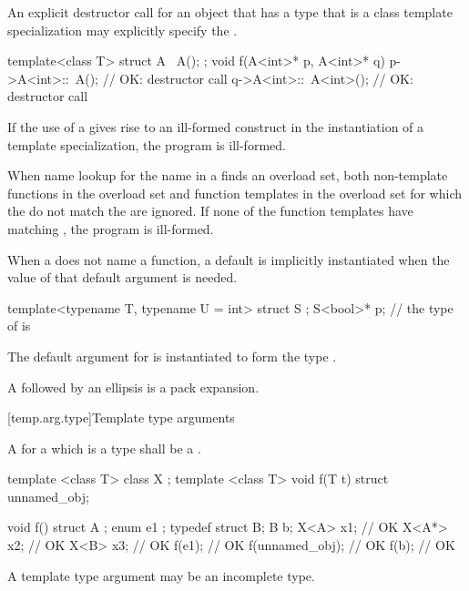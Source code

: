 \pnum
An explicit destructor call for an object that has a type
that is a class template specialization may explicitly specify the
.
\begin{example}

\begin{codeblock}
template<class T> struct A {
  ~A();
};
void f(A<int>* p, A<int>* q) {
  p->A<int>::~A();              // OK: destructor call
  q->A<int>::~A<int>();         // OK: destructor call
}
\end{codeblock}
\end{example}

\pnum
If the use of a
gives rise to an ill-formed construct in the instantiation of a
template specialization, the program is ill-formed.

\pnum
When name lookup for the name in a
finds an overload set, both non-template functions in the overload
set and function templates in the overload set for
which the
do not match the
are ignored.
If none of the function templates have matching
,
the program is ill-formed.

\pnum
When a  does not name a function,
a default  is
implicitly instantiated
when the value of that default argument is needed.
\begin{example}
\begin{codeblock}
template<typename T, typename U = int> struct S { };
S<bool>* p;         // the type of  is 
\end{codeblock}
The default argument for  is instantiated to form the type .
\end{example}

\pnum
A  followed by an ellipsis is
a pack expansion.

[temp.arg.type]{Template type arguments}

\pnum
A
for a
which is a type
shall be a
.

\pnum
\begin{example}
\begin{codeblock}
template <class T> class X { };
template <class T> void f(T t) { }
struct { } unnamed_obj;

void f() {
  struct A { };
  enum { e1 };
  typedef struct { } B;
  B b;
  X<A> x1;          // OK
  X<A*> x2;         // OK
  X<B> x3;          // OK
  f(e1);            // OK
  f(unnamed_obj);   // OK
  f(b);             // OK
}
\end{codeblock}
\end{example}
\begin{note}
A template type argument may be an incomplete type.
\end{note}

